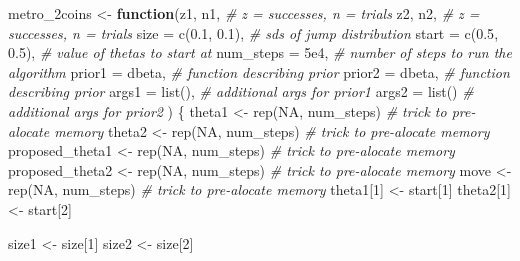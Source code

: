 \documentclass[
  12pt,
]{book}
\newenvironment{Shaded}{\begin{snugshade}}{\end{snugshade}}
\newcommand{\AttributeTok}[1]{\textcolor[rgb]{0.77,0.63,0.00}{#1}}
\newcommand{\CommentTok}[1]{\textcolor[rgb]{0.56,0.35,0.01}{\textit{#1}}}
\newcommand{\ConstantTok}[1]{\textcolor[rgb]{0.00,0.00,0.00}{#1}}
\newcommand{\ControlFlowTok}[1]{\textcolor[rgb]{0.13,0.29,0.53}{\textbf{#1}}}
\newcommand{\DecValTok}[1]{\textcolor[rgb]{0.00,0.00,0.81}{#1}}
\newcommand{\FloatTok}[1]{\textcolor[rgb]{0.00,0.00,0.81}{#1}}
\newcommand{\FunctionTok}[1]{\textcolor[rgb]{0.00,0.00,0.00}{#1}}
\newcommand{\NormalTok}[1]{#1}
\newcommand{\OtherTok}[1]{\textcolor[rgb]{0.56,0.35,0.01}{#1}}
\theoremstyle{definition}
\theoremstyle{definition}
\theoremstyle{definition}
\theoremstyle{definition}
\theoremstyle{remark}
\begin{document}
\begin{Shaded}
\begin{Highlighting}[]
\NormalTok{metro\_2coins }\OtherTok{\textless{}{-}} \ControlFlowTok{function}\NormalTok{(z1, n1, }\CommentTok{\# z = successes, n = trials}
\NormalTok{                         z2, n2, }\CommentTok{\# z = successes, n = trials}
                         \AttributeTok{size =} \FunctionTok{c}\NormalTok{(}\FloatTok{0.1}\NormalTok{, }\FloatTok{0.1}\NormalTok{), }\CommentTok{\# sds of jump distribution}
                         \AttributeTok{start =} \FunctionTok{c}\NormalTok{(}\FloatTok{0.5}\NormalTok{, }\FloatTok{0.5}\NormalTok{), }\CommentTok{\# value of thetas to start at}
                         \AttributeTok{num\_steps =} \FloatTok{5e4}\NormalTok{, }\CommentTok{\# number of steps to run the algorithm}
                         \AttributeTok{prior1 =}\NormalTok{ dbeta, }\CommentTok{\# function describing prior}
                         \AttributeTok{prior2 =}\NormalTok{ dbeta, }\CommentTok{\# function describing prior}
                         \AttributeTok{args1 =} \FunctionTok{list}\NormalTok{(), }\CommentTok{\# additional args for prior1}
                         \AttributeTok{args2 =} \FunctionTok{list}\NormalTok{() }\CommentTok{\# additional args for prior2}
\NormalTok{) \{}
\NormalTok{  theta1 }\OtherTok{\textless{}{-}} \FunctionTok{rep}\NormalTok{(}\ConstantTok{NA}\NormalTok{, num\_steps) }\CommentTok{\# trick to pre{-}alocate memory}
\NormalTok{  theta2 }\OtherTok{\textless{}{-}} \FunctionTok{rep}\NormalTok{(}\ConstantTok{NA}\NormalTok{, num\_steps) }\CommentTok{\# trick to pre{-}alocate memory}
\NormalTok{  proposed\_theta1 }\OtherTok{\textless{}{-}} \FunctionTok{rep}\NormalTok{(}\ConstantTok{NA}\NormalTok{, num\_steps) }\CommentTok{\# trick to pre{-}alocate memory}
\NormalTok{  proposed\_theta2 }\OtherTok{\textless{}{-}} \FunctionTok{rep}\NormalTok{(}\ConstantTok{NA}\NormalTok{, num\_steps) }\CommentTok{\# trick to pre{-}alocate memory}
\NormalTok{  move }\OtherTok{\textless{}{-}} \FunctionTok{rep}\NormalTok{(}\ConstantTok{NA}\NormalTok{, num\_steps) }\CommentTok{\# trick to pre{-}alocate memory}
\NormalTok{  theta1[}\DecValTok{1}\NormalTok{] }\OtherTok{\textless{}{-}}\NormalTok{ start[}\DecValTok{1}\NormalTok{]}
\NormalTok{  theta2[}\DecValTok{1}\NormalTok{] }\OtherTok{\textless{}{-}}\NormalTok{ start[}\DecValTok{2}\NormalTok{]}

\NormalTok{  size1 }\OtherTok{\textless{}{-}}\NormalTok{ size[}\DecValTok{1}\NormalTok{]}
\NormalTok{  size2 }\OtherTok{\textless{}{-}}\NormalTok{ size[}\DecValTok{2}\NormalTok{]}


\end{Highlighting}
\end{Shaded}
\end{document}
